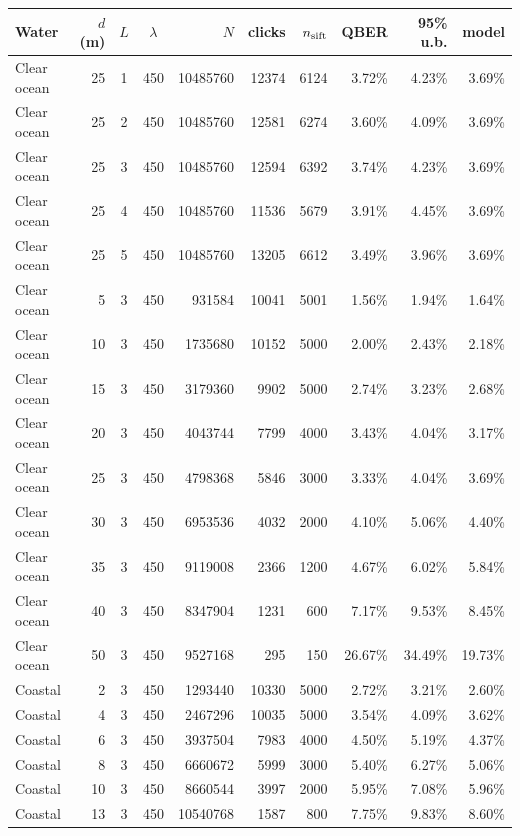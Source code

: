 \begin{tabular}{l r c c r r r r r r}
\hline
Water & $d$ (m) & $L$ & $\lambda$ & $N$ & clicks & $n_{\rm sift}$ & QBER & 95\% u.b. & model \\
\hline
Clear ocean & 25 & 1 & 450 & 10485760 & 12374 & 6124 & 3.72\% & 4.23\% & 3.69\% \\
Clear ocean & 25 & 2 & 450 & 10485760 & 12581 & 6274 & 3.60\% & 4.09\% & 3.69\% \\
Clear ocean & 25 & 3 & 450 & 10485760 & 12594 & 6392 & 3.74\% & 4.23\% & 3.69\% \\
Clear ocean & 25 & 4 & 450 & 10485760 & 11536 & 5679 & 3.91\% & 4.45\% & 3.69\% \\
Clear ocean & 25 & 5 & 450 & 10485760 & 13205 & 6612 & 3.49\% & 3.96\% & 3.69\% \\
Clear ocean & 5 & 3 & 450 & 931584 & 10041 & 5001 & 1.56\% & 1.94\% & 1.64\% \\
Clear ocean & 10 & 3 & 450 & 1735680 & 10152 & 5000 & 2.00\% & 2.43\% & 2.18\% \\
Clear ocean & 15 & 3 & 450 & 3179360 & 9902 & 5000 & 2.74\% & 3.23\% & 2.68\% \\
Clear ocean & 20 & 3 & 450 & 4043744 & 7799 & 4000 & 3.43\% & 4.04\% & 3.17\% \\
Clear ocean & 25 & 3 & 450 & 4798368 & 5846 & 3000 & 3.33\% & 4.04\% & 3.69\% \\
Clear ocean & 30 & 3 & 450 & 6953536 & 4032 & 2000 & 4.10\% & 5.06\% & 4.40\% \\
Clear ocean & 35 & 3 & 450 & 9119008 & 2366 & 1200 & 4.67\% & 6.02\% & 5.84\% \\
Clear ocean & 40 & 3 & 450 & 8347904 & 1231 & 600 & 7.17\% & 9.53\% & 8.45\% \\
Clear ocean & 50 & 3 & 450 & 9527168 & 295 & 150 & 26.67\% & 34.49\% & 19.73\% \\
Coastal & 2 & 3 & 450 & 1293440 & 10330 & 5000 & 2.72\% & 3.21\% & 2.60\% \\
Coastal & 4 & 3 & 450 & 2467296 & 10035 & 5000 & 3.54\% & 4.09\% & 3.62\% \\
Coastal & 6 & 3 & 450 & 3937504 & 7983 & 4000 & 4.50\% & 5.19\% & 4.37\% \\
Coastal & 8 & 3 & 450 & 6660672 & 5999 & 3000 & 5.40\% & 6.27\% & 5.06\% \\
Coastal & 10 & 3 & 450 & 8660544 & 3997 & 2000 & 5.95\% & 7.08\% & 5.96\% \\
Coastal & 13 & 3 & 450 & 10540768 & 1587 & 800 & 7.75\% & 9.83\% & 8.60\% \\

\end{tabular}
